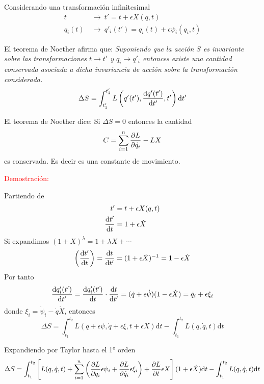 \documentclass[../main]{subfiles}
\begin{document}
Considerando una transformación infinitesimal 
\begin{align}
    t \ &\rightarrow \ t'=t+\epsilon X(q, t)\\
    q_i(t) \ &\rightarrow \ q'_i(t')=q_i(t)+\epsilon\psi_i(q_i, t)
\end{align}

El teorema de Noether afirma que: \textit{Suponiendo que la acción $S$ es invariante sobre las transformaciones $t\rightarrow t'$ y $q_i\rightarrow q'_i$ entonces existe una cantidad conservada asociada a dicha invariancia de acción sobre la transformación considerada.}
\begin{equation}
    \Delta S=\int_{t'_1}^{t'_2} L\left(q'(t'), \dv{q'(t')}{t'}, t'\right)\mathrm{d}t'
\end{equation}

El teorema de Noether dice: Si $\Delta S=0$ entonces la cantidad 
\begin{equation}
    C=\sum_{i=1}^n \pdv{L}{\dot{q}_i}(\dot{q}_i X-\psi_i)-LX
\end{equation}
es conservada. Es decir es una constante de movimiento.

\textcolor{red}{Demostración:}

Partiendo de
\begin{equation}
    \begin{split}
        t'&=t+\epsilon X(q, t)\\
        \dv{t'}{t}&=1+\epsilon\dot{X}
    \end{split}
\end{equation}
Si expandimos $(1+X)^{\lambda}=1+\lambda X+\cdots$
\begin{equation}
    \left(\dv{t'}{t}\right)=\dv{t}{t'}=(1+\epsilon \dot{X})^{-1}=1-\epsilon \dot{X}
\end{equation}
Por tanto 
\begin{equation}
    \dv{q'_i(t')}{t'}=\dv{q'_i(t')}{t}\cdot \dv{t}{t'}=(\dot{q}+\epsilon \dot{\psi})(1-\epsilon \dot{X})=\dot{q}_i+\epsilon \xi_i
\end{equation}
donde $\xi_i=\dot{\psi}_i-\dot{q}\dot{X}$, entonces 
\begin{equation}
    \Delta S=\int_{t_1}^{t_2} L(q+\epsilon \psi, \dot{q}+\epsilon\xi, t+\epsilon X)\mathrm{d}t-\int_{t_1}^{t_2}L(q, \dot{q}, t)\mathrm{d}t
\end{equation}

Expandiendo por Taylor hasta el 1° orden
\begin{equation}
    \begin{split}
        \Delta S=\int_{t_1}^{t_2}\left[L(q, \dot{q}, t)+\sum_{i=1}^n \left(\pdv{L}{q_i}\epsilon\psi_i+\pdv{L}{\dot{q}_i}\epsilon\xi_i\right)+\pdv{L}{t}\epsilon X\right](1+\epsilon \dot{X})\mathrm{d}t-\int_{t_1}^{t_2}L(q, \dot{q}, t)\mathrm{d}t
    \end{split}
\end{equation}
\end{document}
